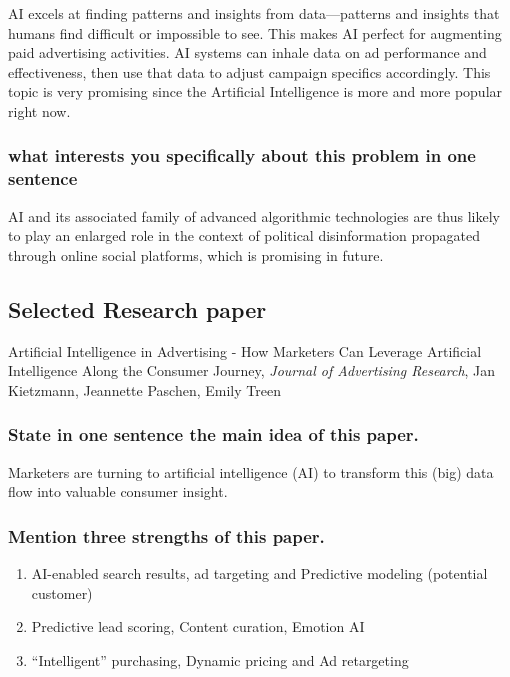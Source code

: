 \documentclass[12pt]{article}%
\begin{document}
AI excels at finding patterns and insights from data—patterns and insights that humans find difficult or impossible to see. This makes AI perfect for augmenting paid advertising activities. AI systems can inhale data on ad performance and effectiveness, then use that data to adjust campaign specifics accordingly. This topic is very promising since the Artificial Intelligence is more and more popular right now.


\subsubsection{what interests you specifically about this problem in one sentence}

AI and its associated family of advanced algorithmic technologies are thus likely to play an enlarged role in the context of political disinformation propagated through online social platforms, which is promising in future.


\subsection{Selected Research paper}

Artificial Intelligence in Advertising - How Marketers Can Leverage Artificial Intelligence Along the Consumer Journey, \textit{Journal of Advertising Research}, Jan Kietzmann, Jeannette Paschen, Emily Treen

\subsubsection{State in one sentence the main idea of this paper.}

Marketers are turning to artificial intelligence (AI) to transform this (big) data flow into valuable consumer insight. 

\subsubsection{Mention three strengths of this paper.}

\begin{enumerate}
\item AI-enabled search results, ad targeting and Predictive modeling (potential customer)
\item Predictive lead scoring, Content curation, Emotion AI
\item “Intelligent” purchasing, Dynamic pricing and Ad retargeting
\end{enumerate}
\end{document}

